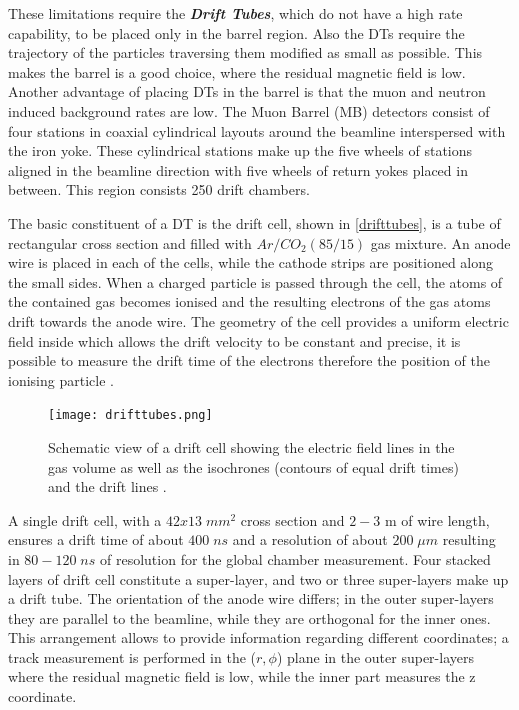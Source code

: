 These limitations require the \emph{\textbf{Drift Tubes}}, which do not have a high rate capability, to be placed only in the barrel region. Also the DTs require the trajectory of the particles traversing them modified as small as possible. This makes the barrel is a good choice, where the residual magnetic field is low. Another advantage of placing DTs in the barrel is that the muon and neutron induced background rates are low. The Muon Barrel (MB) detectors consist of four stations in coaxial cylindrical layouts around the beamline interspersed with the iron yoke. These cylindrical stations make up the five wheels of stations aligned in the beamline direction with five wheels of return yokes placed in between. This region consists 250 drift chambers.

The basic constituent of a DT is the drift cell, shown in \autoref{drifttubes}, is a tube of rectangular cross section and filled with $Ar/CO_2 (85/15)$ gas mixture. An anode wire is placed in each of the cells, while the cathode strips are positioned along the small sides. When a charged particle is passed through the cell, the atoms of the contained gas becomes ionised and the resulting electrons of the gas atoms drift towards the anode wire. The geometry of the cell provides a uniform electric field inside which allows the drift velocity to be constant and precise, it is possible to measure the drift time of the electrons therefore the position of the ionising particle \cite{Sirunyan_2018}.

\begin{figure}[ht]
	\centering
	\texttt{[image: drifttubes.png]}
	\vspace{2mm}
	\caption[Schematic view of a drift cell showing the electric field lines in the gas volume as well as the isochrones (contours of equal drift times) and the drift lines.]{Schematic view of a drift cell showing the electric field lines in the gas volume as well as the isochrones (contours of equal drift times) and the drift lines \cite{Abbiendi:2705998}.}
	\label{drifttubes}
\end{figure}

A single drift cell, with a $42 x 13\; mm^2$ cross section and $2-3$ m of wire length, ensures a drift time of about $400\; ns$ and a resolution of about $200\;\mu m$ resulting in $80-120\;ns$ of resolution for the global chamber measurement. Four stacked layers of drift cell constitute a super-layer, and two or three super-layers make up a drift tube. The orientation of the anode wire differs; in the outer super-layers they are parallel to the beamline, while they are orthogonal for the inner ones. This arrangement allows to provide information regarding different coordinates; a track measurement is performed in the ($r, \phi$) plane in the outer super-layers where the residual magnetic field is low, while the inner part measures the z coordinate.

